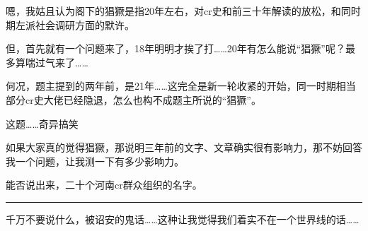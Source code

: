 \begin{zhihuanswer}
嗯，我姑且认为阁下的猖獗是指20年左右，对cr史和前三十年解读的放松，和同时期左派社会调研方面的默许。

但，首先就有一个问题来了，18年明明才挨了打\ldots\ldots20年有怎么能说``猖獗''呢？最多算喘过气来了\ldots\ldots{}

何况，题主提到的两年前，是21年\ldots\ldots 这完全是新一轮收紧的开始，同一时期相当部分cr史大佬已经隐退，怎么也构不成题主所说的``猖獗''。

这题\ldots\ldots 奇异搞笑

如果大家真的觉得猖獗，那说明三年前的文字、文章确实很有影响力，那不妨回答我一个问题，让我测一下有多少影响力。

能否说出来，二十个河南cr群众组织的名字。

\begin{center}\rule{0.5\linewidth}{0.5pt}\end{center}

千万不要说什么，被诏安的鬼话\ldots\ldots 这种让我觉得我们着实不在一个世界线的话\ldots\ldots{}
\end{zhihuanswer}
